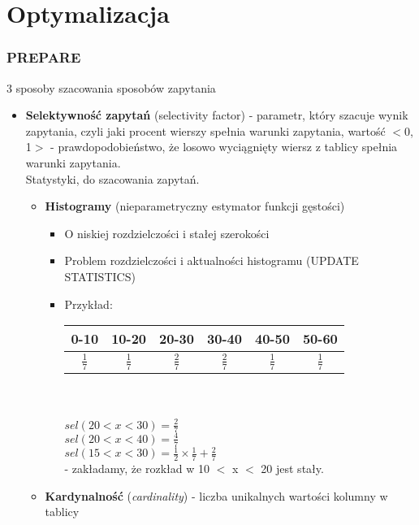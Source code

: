 \documentclass[a4paper,twoside]{article}
\begin{document}
  	
  	\part*{Optymalizacja}
  	\section*{PREPARE}
  	3 sposoby szacowania sposobów zapytania
  	\begin{itemize}
  		\item \textbf{Selektywność zapytań} (selectivity factor) - parametr, który szacuje wynik zapytania, czyli jaki procent wierszy spełnia warunki zapytania, wartość $ < $0, 1$ > $ - prawdopodobieństwo, że losowo wyciągnięty wiersz z tablicy spełnia warunki zapytania.\\
  		Statystyki, do szacowania zapytań.\
  		\begin{itemize}
  			\item \textbf{Histogramy} (nieparametryczny estymator funkcji gęstości)
  			\begin{itemize}
  				\item O niskiej rozdzielczości i stałej szerokości
  				\item Problem rozdzielczości i aktualności histogramu (UPDATE STATISTICS)
  				\item Przykład:\\
	  				\begin{tabular}{c|c|c|c|c|c}
	  					\hline
	  					0-10 & 10-20 & 20-30 & 30-40 & 40-50 & 50-60\\
	  					\hline
	  					\(\frac{1}{7}\) & \(\frac{1}{7}\) & \(\frac{2}{7}\) & \(\frac{2}{7}\) & \(\frac{1}{7}\) & \(\frac{1}{7}\)\\
	  					\hline
	  				\end{tabular}\\\\
	  				\(sel(20 < x < 30)=\frac{2}{7}\)\\
	  				\(sel(20 < x < 40)=\frac{4}{7}\)\\
	  				\(sel(15 < x < 30)=\frac{1}{2}\times \frac{1}{7}+\frac{2}{7}\)\\ - zakładamy, że rozkład w 10 $ < $ x $ < $ 20 jest stały.
  			\end{itemize}
  			\item \textbf{Kardynalność} (\textit{cardinality}) - liczba unikalnych wartości kolumny w tablicy\\

\end{itemize}
\end{itemize}
\end{document}
